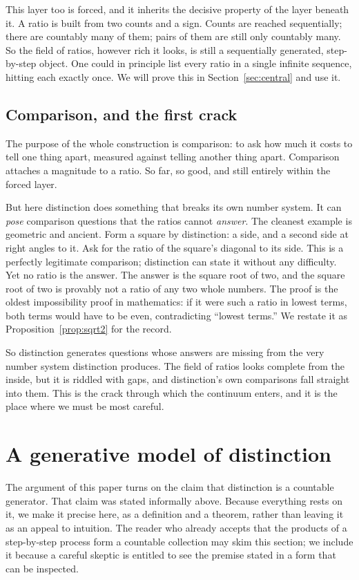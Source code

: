 \documentclass[11pt,a4paper]{article}
\theoremstyle{definition}
\theoremstyle{remark}
\begin{document}
This layer too is forced, and it inherits the decisive property of the layer
beneath it. A ratio is built from two counts and a sign. Counts are reached
sequentially; there are countably many of them; pairs of them are still only
countably many. So the field of ratios, however rich it looks, is still a
sequentially generated, step-by-step object. One could in principle list every
ratio in a single infinite sequence, hitting each exactly once. We will prove
this in Section~\ref{sec:central} and use it.

\subsection{Comparison, and the first crack}

The purpose of the whole construction is comparison: to ask how much it costs to
tell one thing apart, measured against telling another thing apart. Comparison
attaches a magnitude to a ratio. So far, so good, and still entirely within the
forced layer.

But here distinction does something that breaks its own number system. It can
\emph{pose} comparison questions that the ratios cannot \emph{answer}. The
cleanest example is geometric and ancient. Form a square by distinction: a side,
and a second side at right angles to it. Ask for the ratio of the square's
diagonal to its side. This is a perfectly legitimate comparison; distinction can
state it without any difficulty. Yet no ratio is the answer. The answer is the
square root of two, and the square root of two is provably not a ratio of any two
whole numbers. The proof is the oldest impossibility proof in mathematics: if it
were such a ratio in lowest terms, both terms would have to be even, contradicting
``lowest terms.'' We restate it as Proposition~\ref{prop:sqrt2} for the record.

So distinction generates questions whose answers are missing from the very number
system distinction produces. The field of ratios looks complete from the inside,
but it is riddled with gaps, and distinction's own comparisons fall straight into
them. This is the crack through which the continuum enters, and it is the place
where we must be most careful.

\section{A generative model of distinction}\label{sec:model}

The argument of this paper turns on the claim that distinction is a countable
generator. That claim was stated informally above. Because everything rests on
it, we make it precise here, as a definition and a theorem, rather than leaving
it as an appeal to intuition. The reader who already accepts that the products
of a step-by-step process form a countable collection may skim this section; we
include it because a careful skeptic is entitled to see the premise stated in a
form that can be inspected.
\end{document}
